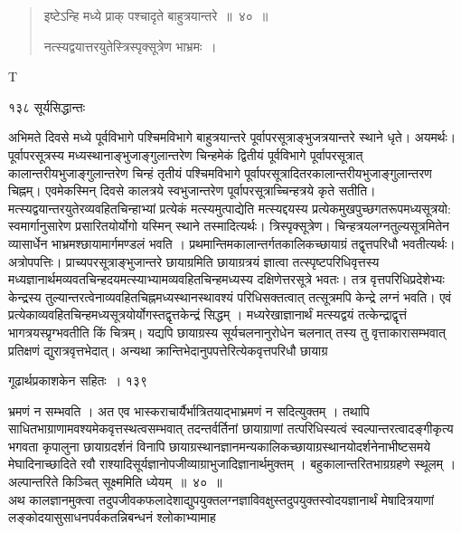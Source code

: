 \documentclass[11pt, openany]{book}
\begin{document}
\begin{quote}
  {\ssi इष्टेऽन्हि मध्ये प्राक् पश्चादृते बाहुत्रयान्तरे~॥~४०~॥
  
 नत्स्यद्वयात्तरयुतेस्त्रिस्पृक्सूत्रेण भाभ्रमः~।}
\end{quote}
 {\tiny{T}}


\newpage


\noindent १३८ \hspace{4cm} सूर्यसिद्धान्तः
\vspace{1cm}

\begin{sloppypar}
अभिमते दिवसे मध्ये पूर्वविभागे पश्चिमविभागे बाहुत्रयान्तरे पूर्वापरसूत्राङ्भुजत्रयान्तरे स्थाने धृते। अयमर्थः। पूर्वापरसूत्रस्य मध्यस्थानाङ्भुजाङ्गुलान्तरेण चिन्हमेकं द्वितीयं पूर्वविभागे पूर्वापरसूत्रात् कालान्तरीयभुजाङ्गुलान्तरेण चिन्हं तृतीयं पश्चिमविभागे पूर्वापरसूत्रादितरकालान्तरीयभुजाङ्गुलान्तरण चिह्नम्। एवमेकस्मिन् दिवसे कालत्रये स्वभुजान्तरेण पूर्वापरसूत्राच्चिन्हत्रये कृते सतीति। मत्स्यद्वयान्तरयुतेरव्यवहितचिन्हाभ्यां प्रत्येकं मत्स्यमुत्पाद्येति मत्स्यद्दयस्य प्रत्येकमुखपुच्छगतरूपमध्यसूत्रयो: स्वमार्गानुसारेण प्रसारितयोर्योगो यस्मिन् स्थाने तस्मादित्यर्थः। त्रिस्पृक्सूत्रेण। चिन्हत्रयलग्नतुल्यसूत्रमितेन व्यासार्धेन भाभ्रमश्छायामार्गमण्डलं भवति । प्रथमान्तिमकालान्तर्गतकालिकच्छायाग्रं तद्वृत्तपरिधौ भवतीत्यर्थः। अत्रोपपत्तिः। प्राच्यपरसूत्राङ्भुजान्तरे छायाग्रमिति छायाग्रत्रयं ज्ञात्वा तत्स्पृष्टपरिधिवृत्तस्य मध्यज्ञानार्थमव्यवतचिन्हदयमत्स्याभ्यामव्यवहितचिन्हमध्यस्य दक्षिणेत्तरसूत्रे भवतः। तत्र वृत्तपरिधिप्रदेशेभ्यः केन्द्रस्य तुल्यान्तरत्वेनाव्यवहितचिह्नमध्यस्थानस्थावश्यं परिधिसक्तत्वात् तत्सूत्रमपि केन्द्रे लग्नं भवति। एवं प्रत्येकाव्यवहितचिन्हमध्यसूत्रयोर्योगस्तद्वृत्तकेन्द्रं सिद्धम् । मध्यरेखाज्ञानार्थं मत्स्यद्वयं तत्केन्द्राद्वृत्तं भागत्रयस्प्रृग्भवतीति किं चित्रम्। यद्यपि छायाग्रस्य सूर्यचलनानुरोधेन चलनात् तस्य तु वृत्ताकारासम्भवात् प्रतिक्षणं द्युरात्रवृत्तभेदात्। अन्यथा क्रान्तिभेदानुपपत्तेरित्येकवृत्तपरिधौ छायाग्र\textendash
\end{sloppypar}



\newpage

\hspace{3cm}  गूढार्थप्रकाशकेन सहितः~। \hfill १३९
\vspace{1cm}

\begin{sloppypar}
\noindent भ्रमणं न सम्भवति । अत एव भास्कराचार्यैर्भात्रितयाद्भाभ्रमणं न सदित्युक्तम् । तथापि साधितभाग्राणामवश्यमेकवृत्तस्थत्वसम्भवात् तदन्तर्वर्तिनां छायाग्राणां तत्परिधिस्यत्वं स्वल्पान्तरत्वादङ्गीकृत्य भगवता कृपालुना छायाग्रदर्शनं विनापि छायाग्रस्थानज्ञानमन्यकालिकच्छायाग्रस्थानयोदर्शनेनाभीष्टसमये मेघादिनाच्छादिते रवौ राश्यादिसूर्यज्ञानोपजीव्याग्राभुजादिज्ञानार्थमुक्तम् । बहुकालान्तरितभाग्रग्रहणे स्थूलम् । अल्पान्तरिते किञ्चित् सूक्ष्ममिति ध्येयम्~॥~४०~॥\\
\noindent अथ कालज्ञानमुक्त्वा तदुपजीवकफलादेशाद्युपयुक्तलग्नज्ञाविवक्षुस्तदुपयुक्तस्वोदयज्ञानार्थं मेषादित्रयाणां लङ्कोदयासुसाधनपर्वकतन्निबन्धनं श्लोकाभ्यामाह\textendash
\end{sloppypar}
\end{document}
